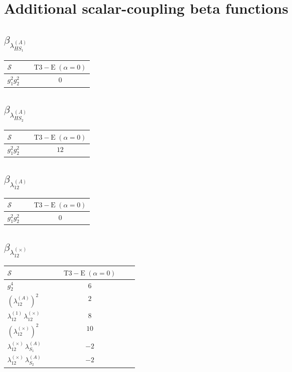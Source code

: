 \documentclass[9pt]{article}
\begin{document}
\section*{Additional scalar-coupling beta functions}
\subsection*{$ \beta_{\lambda_{HS_1}^{(A)}} $}
\begin{longtable}{@{}p{0.31\linewidth}c@{}}
\toprule
$\mathcal{S}$ & $ \mathrm{T3-E}\;(\alpha=0) $ \\
\midrule
$ g_1^2g_2^2 $ & $ 0 $ \\
\bottomrule
\end{longtable}
\subsection*{$ \beta_{\lambda_{HS_2}^{(A)}} $}
\begin{longtable}{@{}p{0.31\linewidth}c@{}}
\toprule
$\mathcal{S}$ & $ \mathrm{T3-E}\;(\alpha=0) $ \\
\midrule
$ g_1^2g_2^2 $ & $ 12 $ \\
\bottomrule
\end{longtable}
\subsection*{$ \beta_{\lambda_{12}^{(A)}} $}
\begin{longtable}{@{}p{0.31\linewidth}c@{}}
\toprule
$\mathcal{S}$ & $ \mathrm{T3-E}\;(\alpha=0) $ \\
\midrule
$ g_1^2g_2^2 $ & $ 0 $ \\
\bottomrule
\end{longtable}
\subsection*{$ \beta_{\lambda_{12}^{(\times)}} $}
\begin{longtable}{@{}p{0.31\linewidth}c@{}}
\toprule
$\mathcal{S}$ & $ \mathrm{T3-E}\;(\alpha=0) $ \\
\midrule
$ g_2^4 $ & $ 6 $ \\
$ \left(\lambda_{12}^{(A)}\right)^2 $ & $ 2 $ \\
$ \lambda_{12}^{(1)}\,\lambda_{12}^{(\times)} $ & $ 8 $ \\
$ \left(\lambda_{12}^{(\times)}\right)^2 $ & $ 10 $ \\
$ \lambda_{12}^{(\times)}\,\lambda_{S_1}^{(A)} $ & $ -2 $ \\
$ \lambda_{12}^{(\times)}\,\lambda_{S_2}^{(A)} $ & $ -2 $ \\
\bottomrule
\end{longtable}
\end{document}
